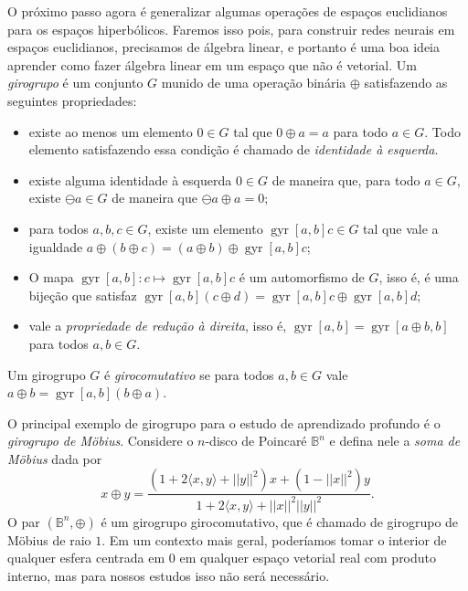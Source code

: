 \documentclass{article}
\DeclareMathOperator{\gyr}{gyr}
\begin{document}
O próximo passo agora é generalizar algumas operações de espaços euclidianos para os espaços hiperbólicos. Faremos isso pois, para construir redes neurais em espaços euclidianos, precisamos de álgebra linear, e portanto é uma boa ideia aprender como fazer álgebra linear em um espaço que não é vetorial. Um \textit{girogrupo} é um conjunto $G$ munido de uma operação binária $\oplus$ satisfazendo as seguintes propriedades: \begin{itemize}
    \item existe ao menos um elemento $0 \in G$ tal que $0 \oplus a = a$ para todo $a \in G$. Todo elemento satisfazendo essa condição é chamado de \textit{identidade à esquerda}.
    \item existe alguma identidade à esquerda $0 \in G$ de maneira que, para todo $a \in G$, existe $\ominus a \in G$ de maneira que $\ominus a \oplus a = 0$;
    \item para todos $a, b, c \in G$, existe um elemento $\gyr[a,b]c \in G$ tal que vale a igualdade $a \oplus (b \oplus c) = (a \oplus b) \oplus \gyr[a,b]c$;
    \item O mapa $\gyr[a,b] \colon c \mapsto \gyr[a,b]c$ é um automorfismo de $G$, isso é, é uma bijeção que satisfaz $\gyr[a,b](c \oplus d) = \gyr[a,b]c \oplus \gyr[a,b]d$;
    \item vale a \textit{propriedade de redução à direita}, isso é, $\gyr[a,b] = \gyr[a \oplus b, b]$ para todos $a, b \in G$.
\end{itemize} Um girogrupo $G$ é \textit{girocomutativo} se para todos $a, b \in G$ vale $a \oplus b = \gyr[a,b](b \oplus a)$.

O principal exemplo de girogrupo para o estudo de aprendizado profundo é o \textit{girogrupo de Möbius}. Considere o $n$-disco de Poincaré $\mathbb{B}^n$ e defina nele a \textit{soma de Möbius} dada por \begin{equation}
    x \oplus y = \frac{(1 + 2\langle x, y \rangle + ||y||^2)x + (1 - ||x||^2)y}{1 + 2\langle x, y \rangle + ||x||^2 ||y||^2}.
\end{equation} O par $(\mathbb{B}^n, \oplus)$ é um girogrupo girocomutativo, que é chamado de girogrupo de Möbius de raio $1$. Em um contexto mais geral, poderíamos tomar o interior de qualquer esfera centrada em $0$ em qualquer espaço vetorial real com produto interno, mas para nossos estudos isso não será necessário.
\end{document}
